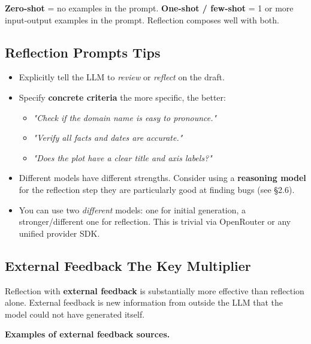 \documentclass[a4paper,11pt]{article}
\begin{document}
\textbf{Zero-shot} = no examples in the prompt.
\textbf{One-shot / few-shot} = 1 or more input-output examples in the
prompt. Reflection composes well with both.

\subsection{Reflection Prompts \textemdash{} Tips}

\begin{itemize}[noitemsep, leftmargin=1.2em]
  \item Explicitly tell the LLM to \textit{review} or \textit{reflect}
        on the draft.
  \item Specify \textbf{concrete criteria} \textemdash{} the more
        specific, the better:
        \begin{itemize}[noitemsep, leftmargin=1.2em]
          \item \textit{"Check if the domain name is easy to pronounce."}
          \item \textit{"Verify all facts and dates are accurate."}
          \item \textit{"Does the plot have a clear title and axis
                labels?"}
        \end{itemize}
  \item Different models have different strengths. Consider using a
        \textbf{reasoning model} for the reflection step \textemdash{}
        they are particularly good at finding bugs (see §2.6).
  \item You can use two \textit{different} models: one for initial
        generation, a stronger/different one for reflection. This is
        trivial via OpenRouter or any unified provider SDK.
\end{itemize}

\subsection{External Feedback \textemdash{} The Key Multiplier}

\begin{ambercallout}
Reflection with \textbf{external feedback} is substantially more
effective than reflection alone. External feedback is new information
from outside the LLM that the model could not have generated itself.
\end{ambercallout}

\textbf{Examples of external feedback sources.}
\end{document}
